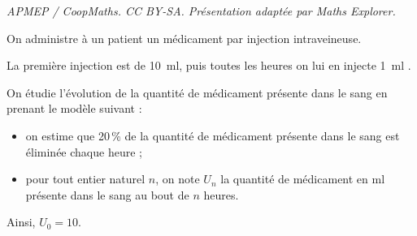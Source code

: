 \documentclass[10pt]{article}
\providecommand{\np}[2][]{{#2~#1}}
\begin{document}
\noindent\textit{APMEP / CoopMaths. CC BY-SA. Présentation adaptée par Maths Explorer.}\par\medskip
\medskip

On administre à un patient un médicament par injection intraveineuse.

La première injection est de \np[ml]{10}, puis toutes les heures on lui en injecte \np[ml]{1} .

On étudie l’évolution de la quantité de médicament présente dans le sang en prenant le modèle suivant :

\begin{itemize}
\item  on estime que 20\,\% de la quantité de médicament présente dans le sang est éliminée chaque heure ;
 
 \item pour tout entier naturel $n$, on note $U_n$ la quantité de médicament en ml présente dans le sang au bout de $n$ heures.
\end{itemize}
Ainsi, $U_0=10$.
\end{document}
